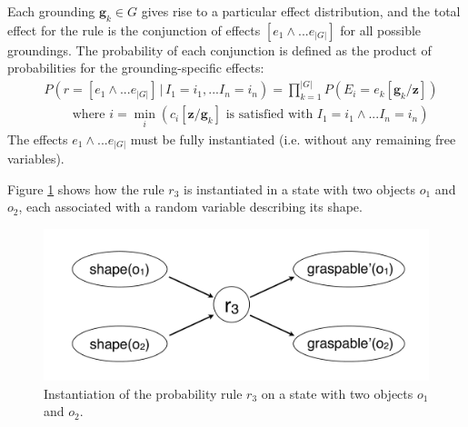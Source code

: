  Each grounding $\mathbf{g}_k \in G$ gives rise to a particular effect distribution, and the total effect for the rule is the conjunction of effects $[e_1 \land ... e_{|G|}]$ for all possible groundings.  The probability of each conjunction is defined as the product of probabilities for the grounding-specific effects:
\begin{align}
& P(r\!=\![e_1 \land ... e_{|G|}] \, | \, I_1\!=\!i_1,... I_n\!=\!i_n) = \prod_{k=1}^{|G|} P(E_i = e_k[\mathbf{g}_k / \mathbf{z}]) \label{eq:quantifruledistrib}
 \\
& \; \; \; \; \; \; \; \; \text{where } i = \min_i (c_i[\mathbf{z} / \mathbf{g}_k]\text{ is satisfied with } I_1\!=\!i_1 \land ... I_n\!=\!i_n) \nonumber
\end{align}
The effects $e_1 \land ... e_{|G|}$ must be fully instantiated (i.e. without any remaining free variables).  %

Figure \ref{fig:quantinstantitionprob} shows how the rule $r_3$ is instantiated in a state with two objects $o_1$ and $o_2$, each associated with a random variable describing its shape.

\begin{figure}[h]
\centering
\includegraphics[scale=0.25]{imgs/quantruleinstantiation.pdf}
\caption{Instantiation of the probability rule $r_3$ on a state with two objects $o_1$ and $o_2$.}
\label{fig:quantinstantitionprob}
\end{figure}

